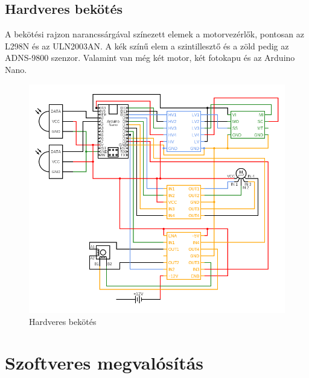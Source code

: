 \documentclass[]{thesis-ekf}
\theoremstyle{definition}
\theoremstyle{remark}
\begin{document}
	\section{Hardveres bekötés}
	A bekötési rajzon narancssárgával színezett elemek a motorvezérlők, pontosan az L298N és az ULN2003AN. A kék színű elem a szintillesztő és a zöld pedig az ADNS-9800 szenzor. Valamint van még két motor, két fotokapu és az Arduino Nano.
	\begin{figure}[th!]
		\centering
		\includegraphics[width=1\linewidth]{circuit}
		\caption[Hardveres bekötés]{Hardveres bekötés}
		\label{fig:circuit}
	\end{figure}
	\chapter{Szoftveres megvalósítás}
	
	
\end{document}
